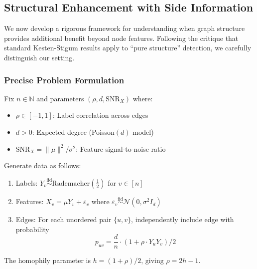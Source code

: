 
\subsection{Structural Enhancement with Side Information}
\label{subsec:structural_enhancement_revised}

We now develop a rigorous framework for understanding when graph structure provides additional benefit beyond node features. Following the critique that standard Kesten-Stigum results apply to ``pure structure'' detection, we carefully distinguish our setting.

\subsubsection{Precise Problem Formulation}

\begin{definition}
\label{def:csbm_precise}
Fix $n \in \mathbb{N}$ and parameters $(\rho, d, \text{SNR}_X)$ where:
\begin{itemize}
    \item $\rho \in [-1, 1]$: Label correlation across edges
    \item $d > 0$: Expected degree (Poisson$(d)$ model)
    \item $\text{SNR}_X = \|\mu\|^2 / \sigma^2$: Feature signal-to-noise ratio
\end{itemize}

Generate data as follows:
\begin{enumerate}
    \item Labels: $Y_v \stackrel{\text{iid}}{\sim} \mathrm{Rademacher}(\frac{1}{2})$ for $v \in [n]$
    \item Features: $X_v = \mu Y_v + \varepsilon_v$ where $\varepsilon_v \stackrel{\text{iid}}{\sim} \mathcal{N}(0, \sigma^2 I_d)$
    \item Edges: For each unordered pair $\{u, v\}$, independently include edge with probability
    \begin{equation}
        p_{uv} = \frac{d}{n} \cdot \left(1 + \rho \cdot Y_u Y_v\right) / 2
    \end{equation}
\end{enumerate}
The homophily parameter is $h = (1 + \rho)/2$, giving $\rho = 2h - 1$.
\end{definition}

